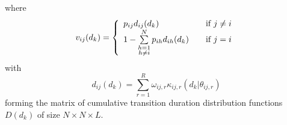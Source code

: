 \documentclass[mscthesis]{usiinfthesis}
\begin{document}
where
\begin{equation}
    \label{eq:V}
    v_{ij}(d_k) = \left\{
        \begin{array}{l l}
            p_{ij} d_{ij}(d_k)
                & \quad \text{if $j \neq i$}\\
            1 - \sum\limits_{\substack{h=1 \\ h \neq i}}^{N} p_{ih} d_{ih}(d_k)
                & \quad \text{if $j = i$}
        \end{array} \right.
\end{equation}
with
\begin{equation}
    \label{eq:D}
    d_{ij}(d_k) = \sum_{r=1}^{R} \omega_{ij,r}\kappa_{ij,r}(d_k|\theta_{ij, r})
\end{equation}
forming the matrix of cumulative transition duration distribution functions
$ D(d_k) $ of size $ N \times N \times L $.
\end{document}
